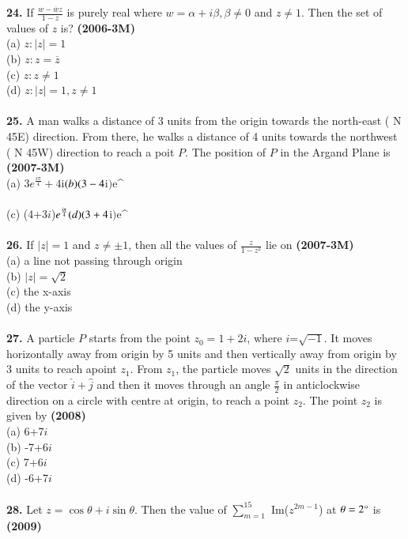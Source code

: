 \documentclass[journal,12pt,twocolumn]{IEEEtran}
\theoremstyle{remark}
\begin{document}
\textbf{24.} If $\frac{w-\overline{w}z}{1-z}$ is purely real where $w=\alpha+i\beta, \beta \neq 0$ and $z \neq 1$. Then the set of values of $z$ is? \textbf{(2006-3M)}\\
(a) {$z:|z|=1$}\\
(b) {$z:z= \overline{z}$}\\
(c) {$z:z \neq 1 $}\\
(d) {$z:|z|=1, z\neq1$}\\
\\
\textbf{25.} A man walks a distance of 3 units from the origin towards the north-east ( N 45\degree E) direction. From there, he walks a distance of 4 units towards the northwest ( N 45\degree W) direction to reach a poit $P$. The position of $P$ in the Argand Plane is \textbf{(2007-3M)}\\
(a) 3$e^{\frac{i\pi}{4}}+4$i$\\\\
(b) (3-4$i$)$e^{}\\\\
(c) (4+3$i$)$e^{\frac{i\pi}{4}}\\\\
(d) (3+4$i$)$e^{}\\
\\
\textbf{26.} If $|z|=1$ and $z\neq\pm1$, then all the values of $\frac{z}{1-z^{2}}$ lie on \textbf{(2007-3M)}\\
(a) a line not passing through origin\\
(b) $|z|=\sqrt{2}$\\
(c) the x-axis\\
(d) the y-axis\\
\\
\textbf{27.} A particle $P$ starts from the point $z_{0}=1+2i$, where $i$=$\sqrt{-1}$. It moves horizontally away from origin by 5 units and then vertically away from origin by 3 units to reach apoint $z_{1}$. From $z_{1}$, the particle moves $\sqrt{2}$ units in the direction of the vector $\hat{i}+\hat{j}$ and then it moves through an angle $\frac{\pi}{2}$ in anticlockwise direction on a circle with centre at origin, to reach a point $z_{2}$. The point $z_{2}$ is given by \textbf{(2008)}\\
(a) 6+7$i$\\
(b) -7+6$i$\\
(c) 7+6$i$\\
(d) -6+7$i$\\
\\
\textbf{28.} Let $z=\cos\theta+i\sin\theta$. Then the value of $\sum_{m=1} ^{15}$ Im($z^{2m-1}$) at $\theta=2\degree$ is \textbf{(2009)}\\
\end{document}
